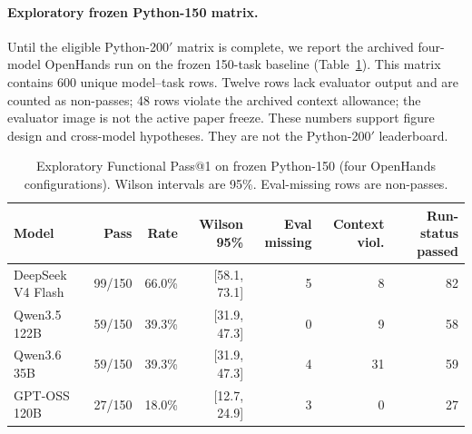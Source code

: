 \documentclass[acmsmall,anonymous,review,screen]{acmart}
\begin{document}
\begin{table}[t]
  \caption{DeepSeek V4 Flash Functional Pass on eligibility slices of the
  2026-08-29 received package, crossed with predecessor-freeze
  (\texttt{474862c2}) contract labels. Not freeze~v2 scores and not the
  Python-200$'$ leaderboard.}
  \label{tab:eligibility-slice}
  \centering
  
\end{table}

\begin{table}[t]
  \caption{Mutually exclusive first outcomes on the fixed eligible 116-task
  subset (no freeze block, wheel gap, or context violation).}
  \label{tab:fixed116-funnel}
  \centering
  
\end{table}

\paragraph{Exploratory frozen Python-150 matrix.}
Until the eligible Python-200$'$ matrix is complete, we report the archived
four-model OpenHands run on the frozen 150-task baseline
(Table~\ref{tab:python150-functional}). This matrix contains 600 unique
model--task rows. Twelve rows lack evaluator output and are counted as
non-passes; 48 rows violate the archived context allowance; the evaluator image
is not the active paper freeze. These numbers support figure design and
cross-model hypotheses. They are not the Python-200$'$ leaderboard.

\begin{table}[t]
  \caption{Exploratory Functional Pass@1 on frozen Python-150 (four OpenHands
  configurations). Wilson intervals are 95\%. Eval-missing rows are non-passes.}
  \label{tab:python150-functional}
  \centering
  \begin{tabular}{lrrrrrr}
  \toprule
  \textbf{Model} & \textbf{Pass} & \textbf{Rate} & \textbf{Wilson 95\%} & \textbf{Eval missing} & \textbf{Context viol.} & \textbf{Run-status passed} \\
  \midrule
  DeepSeek V4 Flash & 99/150 & 66.0\% & [58.1, 73.1] & 5 & 8 & 82 \\
  Qwen3.5 122B & 59/150 & 39.3\% & [31.9, 47.3] & 0 & 9 & 58 \\
  Qwen3.6 35B & 59/150 & 39.3\% & [31.9, 47.3] & 4 & 31 & 59 \\
  GPT-OSS 120B & 27/150 & 18.0\% & [12.7, 24.9] & 3 & 0 & 27 \\
  \bottomrule
  \end{tabular}
\end{table}
\end{document}
